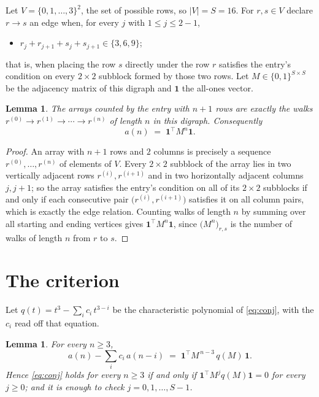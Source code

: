 \documentclass[11pt,a4paper]{article}
\theoremstyle{plain}
\newtheorem{lemma}[theorem]{Lemma}
\theoremstyle{definition}
\begin{document}
Let $V=\{0,1,\dots,3\}^{2}$, the set of possible rows, so $|V|=S=16$. For
$r,s\in V$ declare $r\to s$ an edge when, for every $j$ with $1\le j\le 2-1$,
\begin{itemize}
\item $r_j+r_{j+1}+s_j+s_{j+1}\in\{3, 6, 9\}$;

\end{itemize}
that is, when placing the row $s$ directly under the row $r$ satisfies the entry's
condition on every $2\times2$ subblock formed by those two rows. Let $M\in\{0,1\}^{S\times
S}$ be the adjacency matrix of this digraph and $\mathbf{1}$ the all-ones vector.

\begin{lemma}\label{lem:walk}
The arrays counted by the entry with $n+1$ rows are exactly the walks
$r^{(0)}\to r^{(1)}\to\cdots\to r^{(n)}$ of length $n$ in this digraph. Consequently
\[
a(n)\;=\;\mathbf{1}^{\!\top}M^{n}\mathbf{1} .
\]
\end{lemma}

\begin{proof}
An array with $n+1$ rows and $2$ columns is precisely a sequence
$r^{(0)},\dots,r^{(n)}$ of elements of $V$. Every $2\times2$ subblock of the array lies
in two vertically adjacent rows $r^{(i)},r^{(i+1)}$ and in two horizontally adjacent
columns $j,j+1$; so the array satisfies the entry's condition on all of its $2\times2$
subblocks if and only if each consecutive pair $\bigl(r^{(i)},r^{(i+1)}\bigr)$ satisfies
it on all column pairs, which is exactly the edge relation. Counting walks of length $n$ by
summing over all starting and ending vertices gives
$\mathbf{1}^{\!\top}M^{n}\mathbf{1}$, since
$\bigl(M^{n}\bigr)_{r,s}$ is the number of walks of length $n$ from $r$ to $s$.
\end{proof}

\section{The criterion}

Let $q(t)=t^{3}-\sum_{i}c_i\,t^{3-i}$ be the characteristic polynomial of
\eqref{eq:conj}, with the $c_i$ read off that equation.

\begin{lemma}\label{lem:crit}
For every $n\ge3$,
\[
a(n)-\sum_i c_i\,a(n-i)\;=\;\mathbf{1}^{\!\top}M^{\,n-3}\,q(M)\,\mathbf{1} .
\]
Hence \eqref{eq:conj} holds for every $n\ge3$ if and only if
$\mathbf{1}^{\!\top}M^{j}q(M)\mathbf{1}=0$ for every $j\ge0$; and it is enough to
check $j=0,1,\dots,S-1$.
\end{lemma}
\end{document}
